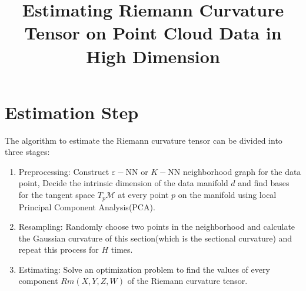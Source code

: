 \documentclass{article}
\title{Estimating Riemann Curvature Tensor on Point Cloud Data in High Dimension}
\author{}
\date{}
\begin{document}
\maketitle
\section{Estimation Step}
The algorithm to estimate the Riemann curvature tensor can be divided into three stages:
\begin{enumerate}
	\item Preprocessing: Construct $\varepsilon-$NN or $K-$NN neighborhood graph for the data point, Decide the intrinsic dimension of the data manifold $d$ and find bases for the tangent space $T_p\mathcal{M}$ at every point $p$ on the manifold using local Principal Component Analysis(PCA). 
	\item Resampling: Randomly choose two points in the neighborhood and calculate the Gaussian curvature of this section(which is the sectional curvature) and repeat this process for $H$ times.
	\item Estimating: Solve an optimization problem to find the values of every component $Rm(X,Y,Z,W)$ of the Riemann curvature tensor.
\end{enumerate}
\end{document}
